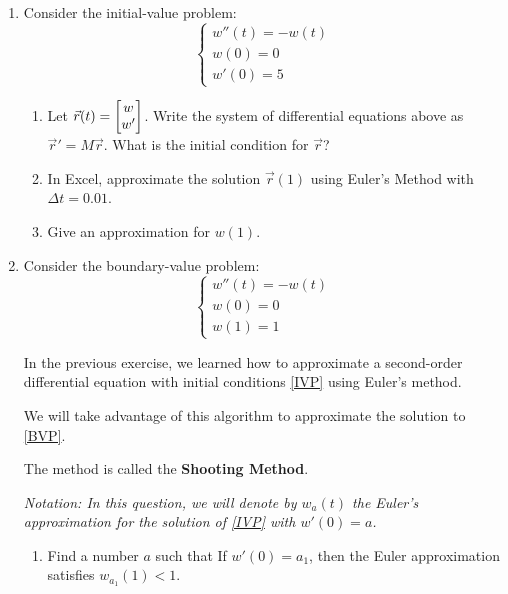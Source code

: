 \begin{enumerate}
	\item Consider the initial-value problem:
		\begin{equation}\tag{IVP}\label{IVP}
		\begin{cases}
			w''(t) = -w(t) \\
			w(0) = 0 \\
			w'(0) = 5
		\end{cases}
	\end{equation}

		
		\begin{enumerate}
			\item Let $\vec{r}(t) = \begin{bmatrix}w \\ w'\end{bmatrix}$. Write the system of differential equations above as $\vec{r}'=M \vec{r}$. What is the initial condition for $\vec{r}$?
			\item In Excel, approximate the solution $\vec{r}(1)$ using Euler's Method with $\Delta t=0.01$.
			\item Give an approximation for $w(1)$.
		\end{enumerate}
	


	\item Consider the boundary-value problem:
		\begin{equation}\tag{BVP}\label{BVP}
		\begin{cases}
			w''(t) = -w(t) \\
			w(0) = 0 \\
			w(1) = 1
		\end{cases}
		\end{equation}

		
	
	In the previous exercise, we learned how to approximate a second-order differential equation with initial conditions \eqref{IVP} using Euler's method.

	We will take advantage of this algorithm to approximate the solution to \eqref{BVP}.
	
	The method is called the \textbf{Shooting Method}.
	
	\textit{Notation: In this question, we will denote by $w_a(t)$ the Euler's approximation for the solution of \eqref{IVP} with $w'(0)=a$.}
	
	
	\begin{enumerate}
		\item Find a number $a$ such that If $w'(0)=a_1$, then the Euler approximation satisfies $w_{a_1}(1)<1$.


\end{enumerate}
\end{enumerate}
